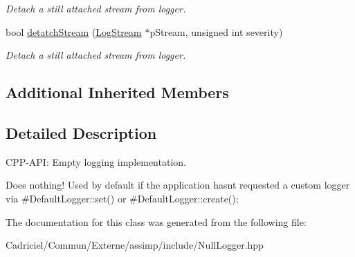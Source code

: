 \begin{DoxyCompactItemize}
\begin{DoxyCompactList}\small\item\em Detach a still attached stream from logger. \end{DoxyCompactList}\item 
bool \hyperlink{class_assimp_1_1_null_logger_ab49b14a0045aab73b813a448b5aa77b4}{detatch\+Stream} (\hyperlink{class_assimp_1_1_log_stream}{Log\+Stream} $\ast$p\+Stream, unsigned int severity)\hypertarget{class_assimp_1_1_null_logger_ab49b14a0045aab73b813a448b5aa77b4}{}\label{class_assimp_1_1_null_logger_ab49b14a0045aab73b813a448b5aa77b4}

\begin{DoxyCompactList}\small\item\em Detach a still attached stream from logger. \end{DoxyCompactList}\end{DoxyCompactItemize}
\subsection*{Additional Inherited Members}


\subsection{Detailed Description}
C\+P\+P-\/\+A\+PI\+: Empty logging implementation. 

Does nothing! Used by default if the application hasn\textquotesingle{}t requested a custom logger via \#\+Default\+Logger\+::set() or \#\+Default\+Logger\+::create(); 

The documentation for this class was generated from the following file\+:\begin{DoxyCompactItemize}
\item 
Cadriciel/\+Commun/\+Externe/assimp/include/Null\+Logger.\+hpp\end{DoxyCompactItemize}
